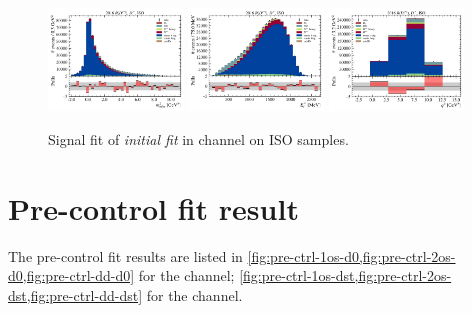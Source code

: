 \begin{figure}[htb]
    \centering
    \includegraphics[width=0.32\textwidth]{./figs-supplemental-plots/init-fit/sig/fit_result-stacked-Dst-iso-mmiss2.pdf}
    \includegraphics[width=0.32\textwidth]{./figs-supplemental-plots/init-fit/sig/fit_result-stacked-Dst-iso-el.pdf}
    \includegraphics[width=0.32\textwidth]{./figs-supplemental-plots/init-fit/sig/fit_result-stacked-Dst-iso-q2.pdf}

    \caption{
        Signal fit of \emph{initial fit} in \Dstar channel on ISO samples.
    }
    \label{fig:init-fit-sig-dst}
\end{figure}


\section{Pre-control fit result}
\label{appx:suppl:fit-pre-ctrl}

The pre-control fit results are listed in
\cref{fig:pre-ctrl-1os-d0,fig:pre-ctrl-2os-d0,fig:pre-ctrl-dd-d0} for the \Dz
channel;
\cref{fig:pre-ctrl-1os-dst,fig:pre-ctrl-2os-dst,fig:pre-ctrl-dd-dst} for the
\Dstar channel.

